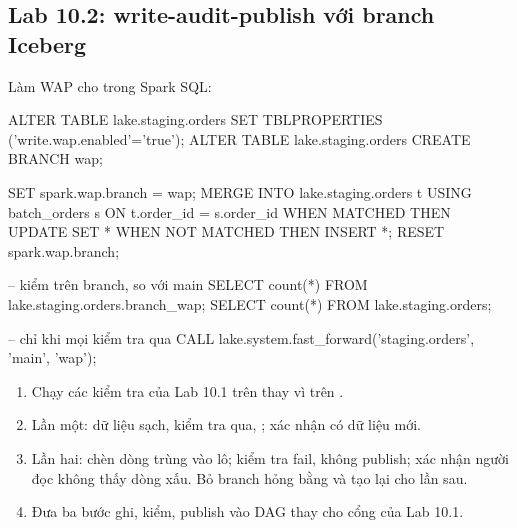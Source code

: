 \subsection{Lab 10.2: write-audit-publish với branch Iceberg}
Làm WAP cho  trong Spark SQL:
\begin{codeblock}
ALTER TABLE lake.staging.orders SET TBLPROPERTIES ('write.wap.enabled'='true');
ALTER TABLE lake.staging.orders CREATE BRANCH wap;

SET spark.wap.branch = wap;
MERGE INTO lake.staging.orders t USING batch_orders s
ON t.order_id = s.order_id
WHEN MATCHED THEN UPDATE SET *
WHEN NOT MATCHED THEN INSERT *;
RESET spark.wap.branch;

-- kiểm trên branch, so với main
SELECT count(*) FROM lake.staging.orders.branch_wap;
SELECT count(*) FROM lake.staging.orders;

-- chỉ khi mọi kiểm tra qua
CALL lake.system.fast_forward('staging.orders', 'main', 'wap');
\end{codeblock}
\begin{enumerate}
  \item Chạy các kiểm tra của Lab 10.1 trên  thay vì trên .
  \item Lần một: dữ liệu sạch, kiểm tra qua, ; xác nhận  có dữ liệu mới.
  \item Lần hai: chèn dòng trùng  vào lô; kiểm tra fail, không publish; xác nhận người đọc  không thấy dòng xấu. Bỏ branch hỏng bằng  và tạo lại cho lần sau.
  \item Đưa ba bước ghi, kiểm, publish vào DAG  thay cho cổng của Lab 10.1.
\end{enumerate}

